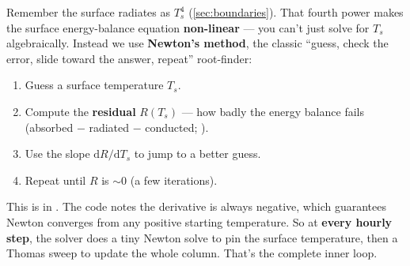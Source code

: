 Remember the surface radiates as $T_s^4$ (\autoref{sec:boundaries}). That fourth
power makes the surface energy-balance equation \textbf{non-linear} --- you can't
just solve for $T_s$ algebraically. Instead we use \textbf{Newton's method}, the
classic ``guess, check the error, slide toward the answer, repeat'' root-finder:
\begin{enumerate}[leftmargin=1.5em,itemsep=2pt]
  \item Guess a surface temperature $T_s$.
  \item Compute the \textbf{residual} $R(T_s)$ --- how badly the energy balance
    fails (absorbed $-$ radiated $-$ conducted;
    ).
  \item Use the slope $\mathrm{d}R/\mathrm{d}T_s$ to jump to a better guess.
  \item Repeat until $R$ is ${\sim}0$ (a few iterations).
\end{enumerate}
This is  in . The code notes
the derivative is always negative, which guarantees Newton converges from any
positive starting temperature. So at \textbf{every hourly step}, the solver does
a tiny Newton solve to pin the surface temperature, then a Thomas sweep to update
the whole column. That's the complete inner loop.
